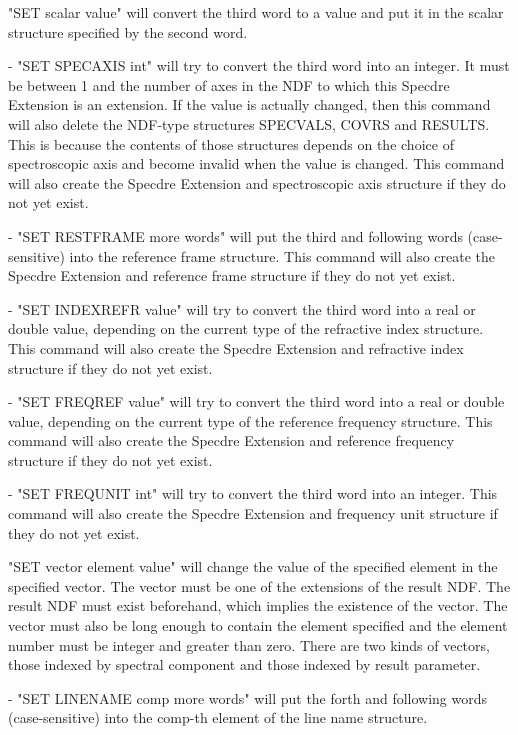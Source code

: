 \begin{description}
   "SET scalar value" will convert the third word to a value and
   put it in the scalar structure specified by the second word.

   -  "SET SPECAXIS int" will try to convert the third word into
      an integer. It must be between 1 and the number of axes in
      the NDF to which this Specdre Extension is an extension. If
      the value is actually changed, then this command will also
      delete the NDF-type structures SPECVALS, COVRS and RESULTS.
      This is because the contents of those structures depends on
      the choice of spectroscopic axis and become invalid when the
      value is changed. This command will also create the Specdre
      Extension and spectroscopic axis structure if they do not
      yet exist.

   -  "SET RESTFRAME more words" will put the third and following
      words (case-sensitive) into the reference frame structure.
      This command will also create the Specdre Extension and
      reference frame structure if they do not yet exist.

   -  "SET INDEXREFR value" will try to convert the third word
      into a real or double value, depending on the current type
      of the refractive index structure. This command will also
      create the Specdre Extension and refractive index structure
      if they do not yet exist.

   -  "SET FREQREF value" will try to convert the third word
      into a real or double value, depending on the current type
      of the reference frequency structure. This command will also
      create the Specdre Extension and reference frequency
      structure if they do not yet exist.

   -  "SET FREQUNIT int" will try to convert the third word into
      an integer. This command will also create the Specdre
      Extension and frequency unit structure if they do not yet
      exist.

   "SET vector element value" will change the value of the
   specified element in the specified vector. The vector must be
   one of the extensions of the result NDF. The result NDF must
   exist beforehand, which implies the existence of the vector.
   The vector must also be long enough to contain the element
   specified and the element number must be integer and greater
   than zero. There are two kinds of vectors, those indexed by
   spectral component and those indexed by result parameter.

   -  "SET LINENAME comp more words" will put the forth and
      following words (case-sensitive) into the comp-th element
      of the line name structure.


\end{description}
